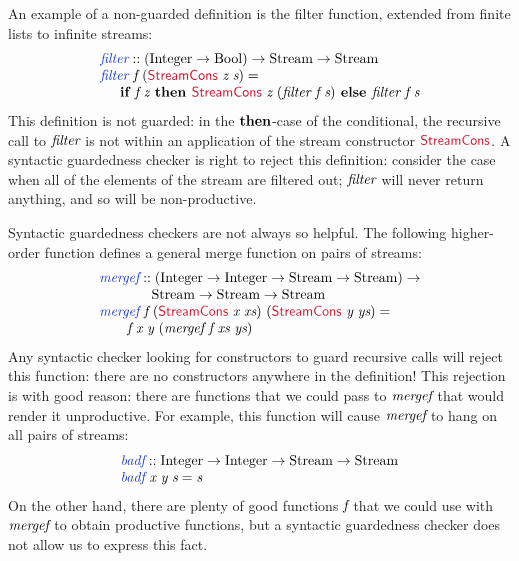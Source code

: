 An example of a non-guarded definition is the filter function,
extended from finite lists to infinite streams:
\begin{displaymath}
  \begin{array}{l}
    \defn{filter} :: (\tyname{Integer} \to \tyname{Bool}) \to \tyname{Stream} \to \tyname{Stream} \\
    \defn{filter}\ \ident{f}\ (\cons{StreamCons}\ \ident{z}\ \ident{s}) = \\
    \hspace{0.5cm}\kw{if }\ident{f}\ \ident{z}\kw{ then }\cons{StreamCons}\ \ident{z}\ (\ident{filter}\ \ident{f}\ \ident{s})\kw{ else }\ident{filter}\ \ident{f}\ \ident{s}
  \end{array}
\end{displaymath}
This definition is not guarded: in the $\textbf{then}$-case of the
conditional, the recursive call to $\textit{filter}$ is not within an
application of the stream constructor $\cons{StreamCons}$. A syntactic
guardedness checker is right to reject this definition: consider the
case when all of the elements of the stream are filtered out;
$\textit{filter}$ will never return anything, and so will be
non-productive.

Syntactic guardedness checkers are not always so helpful. The
following higher-order function defines a general merge function on
pairs of streams:
\begin{displaymath}
  \begin{array}{l}
    \defn{mergef} :: (\tyname{Integer} \to \tyname{Integer} \to \tyname{Stream} \to \tyname{Stream}) \to \\
    \textcolor{white}{\textrm{mergef} :: }\tyname{Stream} \to \tyname{Stream} \to \tyname{Stream} \\
    \defn{mergef}\ \ident{f}\ (\cons{StreamCons}\ \ident{x}\ \ident{xs})\ (\cons{StreamCons}\ \ident{y}\ \ident{ys}) = \\
    \quad\quad \ident{f}\ \ident{x}\ \ident{y}\ (\ident{mergef}\ \ident{f}\ \ident{xs}\ \ident{ys})
  \end{array}
\end{displaymath}
Any syntactic checker looking for constructors to guard recursive
calls will reject this function: there are no constructors anywhere in
the definition! This rejection is with good reason: there are
functions that we could pass to $\textit{mergef}$ that would render it
unproductive. For example, this function will cause $\textit{mergef}$
to hang on all pairs of streams:
\begin{displaymath}
  \begin{array}{l}
    \defn{badf} :: \tyname{Integer} \to \tyname{Integer} \to \tyname{Stream} \to \tyname{Stream} \\
    \defn{badf}\ \ident{x}\ \ident{y}\ \ident{s} = \ident{s}
  \end{array}
\end{displaymath}
On the other hand, there are plenty of good functions $\textit{f}$ that
we could use with $\textit{mergef}$ to obtain productive functions, but
a syntactic guardedness checker does not allow us to express this
fact.

